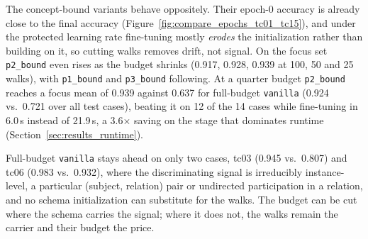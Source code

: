 \documentclass[a4paper,oneside,bibliography=totoc]{scrbook}
\begin{document}
The concept-bound variants behave oppositely. Their epoch-0 accuracy is already
close to the final accuracy (Figure~\ref{fig:compare_epochs_tc01_tc15}), and
under the protected learning rate fine-tuning mostly \emph{erodes} the
initialization rather than building on it, so cutting walks removes drift, not
signal. On the focus set \texttt{p2\_bound} even rises as the budget shrinks
(0.917, 0.928, 0.939 at 100, 50 and 25 walks), with \texttt{p1\_bound} and
\texttt{p3\_bound} following. At a quarter budget \texttt{p2\_bound} reaches a
focus mean of 0.939 against 0.637 for full-budget \texttt{vanilla} (0.924 vs.\
0.721 over all test cases), beating it on 12 of the 14 cases while fine-tuning in
6.0\,s instead of 21.9\,s, a 3.6$\times$ saving on the stage that dominates
runtime (Section~\ref{sec:results_runtime}).

Full-budget \texttt{vanilla} stays ahead on only two cases, tc03 (0.945 vs.\
0.807) and tc06 (0.983 vs.\ 0.932), where the discriminating signal is
irreducibly instance-level, a particular (subject, relation) pair or undirected
participation in a relation, and no schema initialization can substitute for the
walks. The budget can be cut where the schema carries the signal; where it does
not, the walks remain the carrier and their budget the price.

\begin{table}[t]
\centering
\small
\caption{Mean final test accuracy (after 5 fine-tuning epochs) under shrinking
instance-walk budgets, averaged over all 14 comparison test cases
(tc01--tc15 without tc04). All variants share the same walk corpus per budget;
the protograph walk budget is unchanged.}
\label{tab:reduced_walks}

\end{table}
\end{document}
